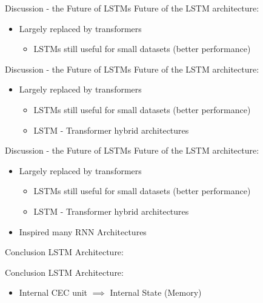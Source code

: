 \documentclass[10pt, aspectratio=169]{beamer}
\begin{document}
\begin{frame}[t]{Discussion - the Future of LSTMs}
Future of the LSTM architecture:
\begin{itemize}
    \item Largely replaced by transformers
    \begin{itemize}
        \item LSTMs still useful for small datasets (better performance)
    \end{itemize} 
\end{itemize}
\end{frame}

\begin{frame}[t]{Discussion - the Future of LSTMs}
Future of the LSTM architecture:
\begin{itemize}
    \item Largely replaced by transformers
    \begin{itemize}
        \item LSTMs still useful for small datasets (better performance)
        \item LSTM - Transformer hybrid architectures 
    \end{itemize} 
\end{itemize}
\end{frame}

\begin{frame}[t]{Discussion - the Future of LSTMs}
Future of the LSTM architecture:
\begin{itemize}
    \item Largely replaced by transformers
    \begin{itemize}
        \item LSTMs still useful for small datasets (better performance)
        \item LSTM - Transformer hybrid architectures 
    \end{itemize} 
    \item Inspired many RNN Architectures
\end{itemize}
\end{frame}

\begin{frame}[t]{Conclusion}
LSTM Architecture:
\end{frame}


\begin{frame}[t]{Conclusion}
LSTM Architecture:
\begin{itemize}
    \item Internal CEC unit \begin{math}\implies \end{math} Internal State (Memory)
\end{itemize}
\end{frame}
\end{document}

